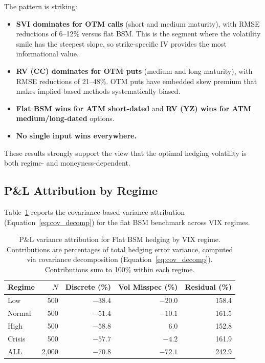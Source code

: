 \documentclass[12pt, letterpaper]{article}
\begin{document}
The pattern is striking:
\begin{itemize}
    \item \textbf{SVI dominates for OTM calls} (short and medium maturity), with RMSE reductions of 6--12\% versus flat BSM. This is the segment where the volatility smile has the steepest slope, so strike-specific IV provides the most informational value.
    \item \textbf{RV (CC) dominates for OTM puts} (medium and long maturity), with RMSE reductions of 21--48\%. OTM puts have embedded skew premium that makes implied-based methods systematically biased.
    \item \textbf{Flat BSM wins for ATM short-dated} and \textbf{RV (YZ) wins for ATM medium/long-dated} options.
    \item \textbf{No single input wins everywhere.}
\end{itemize}

These results strongly support the view that the optimal hedging volatility is both regime- and moneyness-dependent.

\subsection{P\&L Attribution by Regime}
\label{sec:pnl_attribution}

Table~\ref{tab:pnl_attrib} reports the covariance-based variance attribution (Equation~\ref{eq:cov_decomp}) for the flat BSM benchmark across VIX regimes.

\begin{table}[H]
\centering
\caption{P\&L variance attribution for Flat BSM hedging by VIX regime. Contributions are percentages of total hedging error variance, computed via covariance decomposition (Equation~\ref{eq:cov_decomp}). Contributions sum to 100\% within each regime.}
\label{tab:pnl_attrib}
\begin{tabular}{lrrrr}
\toprule
Regime & $N$ & Discrete (\%) & Vol Misspec (\%) & Residual (\%) \\
\midrule
Low     & 500 & $-38.4$ & $-20.0$ & 158.4 \\
Normal  & 500 & $-51.4$ & $-10.1$ & 161.5 \\
High    & 500 & $-58.8$ & 6.0     & 152.8 \\
Crisis  & 500 & $-57.7$ & $-4.2$  & 161.9 \\
\midrule
ALL     & 2,000 & $-70.8$ & $-72.1$ & 242.9 \\
\bottomrule
\end{tabular}
\end{table}
\end{document}

